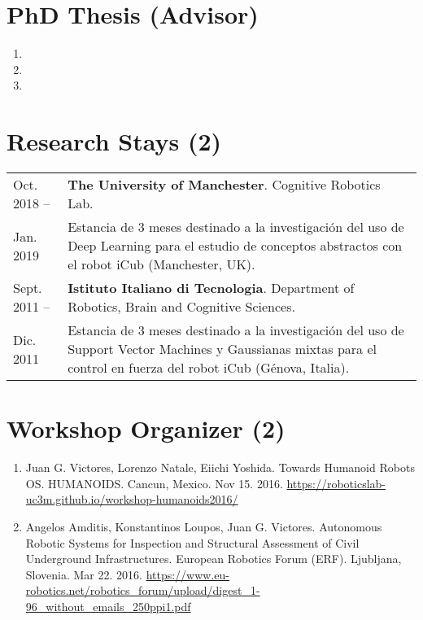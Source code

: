 \documentclass{article}
\begin{document}
\section*{PhD Thesis (Advisor)}
\begin{enumerate}
  \item {}
  \item {}
  \item {}
\end{enumerate}

\section*{Research Stays (2)}
\begin{tabular}{l p{14cm}}
Oct. 2018 --&{\bf The University of Manchester}. Cognitive Robotics Lab.\\
Jan. 2019&Estancia de 3 meses destinado a la investigación del uso de Deep Learning para el estudio de conceptos abstractos con el robot iCub (Manchester, UK).\\
\rule{0pt}{4ex}
Sept. 2011 --&{\bf Istituto Italiano di Tecnologia}. Department of Robotics, Brain and Cognitive Sciences.\\
Dic. 2011&Estancia de 3 meses destinado a la investigación del uso de Support Vector Machines y Gaussianas mixtas para el control en fuerza del robot iCub (Génova, Italia).
\end{tabular}

\section*{Workshop Organizer (2)}
\begin{enumerate}
\item Juan G. Victores, Lorenzo Natale, Eiichi Yoshida. Towards Humanoid Robots OS. HUMANOIDS. Cancun, Mexico. Nov 15. 2016. \url{https://roboticslab-uc3m.github.io/workshop-humanoids2016/}
\item Angelos Amditis, Konstantinos Loupos, Juan G. Victores. Autonomous Robotic Systems for Inspection and Structural Assessment of Civil Underground Infrastructures. European Robotics Forum (ERF). Ljubljana, Slovenia. Mar 22. 2016. \url{https://www.eu-robotics.net/robotics\_forum/upload/digest\_1-96\_without\_emails\_250ppi1.pdf}
\end{enumerate}
\end{document}
